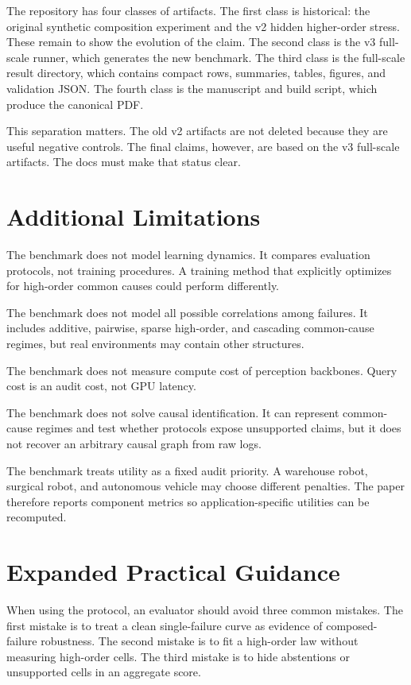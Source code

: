 \documentclass{article}
\begin{document}
The repository has four classes of artifacts. The first class is historical: the original synthetic composition experiment and the v2 hidden higher-order stress. These remain to show the evolution of the claim. The second class is the v3 full-scale runner, which generates the new benchmark. The third class is the full-scale result directory, which contains compact rows, summaries, tables, figures, and validation JSON. The fourth class is the manuscript and build script, which produce the canonical PDF.

This separation matters. The old v2 artifacts are not deleted because they are useful negative controls. The final claims, however, are based on the v3 full-scale artifacts. The docs must make that status clear.

\section{Additional Limitations}

The benchmark does not model learning dynamics. It compares evaluation protocols, not training procedures. A training method that explicitly optimizes for high-order common causes could perform differently.

The benchmark does not model all possible correlations among failures. It includes additive, pairwise, sparse high-order, and cascading common-cause regimes, but real environments may contain other structures.

The benchmark does not measure compute cost of perception backbones. Query cost is an audit cost, not GPU latency.

The benchmark does not solve causal identification. It can represent common-cause regimes and test whether protocols expose unsupported claims, but it does not recover an arbitrary causal graph from raw logs.

The benchmark treats utility as a fixed audit priority. A warehouse robot, surgical robot, and autonomous vehicle may choose different penalties. The paper therefore reports component metrics so application-specific utilities can be recomputed.

\section{Expanded Practical Guidance}

When using the protocol, an evaluator should avoid three common mistakes. The first mistake is to treat a clean single-failure curve as evidence of composed-failure robustness. The second mistake is to fit a high-order law without measuring high-order cells. The third mistake is to hide abstentions or unsupported cells in an aggregate score.
\end{document}
